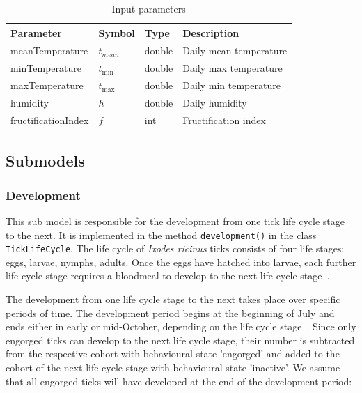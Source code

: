 \documentclass[a4paper, 11pt]{scrartcl}
\newcommand{\inlinecode}[1]{\texttt{\small #1}}
\begin{document}
\begin{table}[h!]
\caption{Input parameters}
\label{tab:input_parameters}
\begin{tabularx}{\textwidth}{llll}
\toprule
\textbf{Parameter} & \textbf{Symbol} & \textbf{Type}     & \textbf{Description}       \\
\midrule
meanTemperature    & $t_{mean}$      & double            & Daily mean temperature     \\
minTemperature     & $t_{\min}$      & double            & Daily max temperature      \\
maxTemperature     & $t_{\max}$      & double            & Daily min temperature      \\
humidity           & $h$             & double            & Daily humidity             \\
\midrule
fructificationIndex & $f$            & int               & Fructification index       \\
\bottomrule
\end{tabularx}
\end{table}


\newpage
\subsection{Submodels}\label{submodels}

\subsubsection{Development}
This sub model is responsible for the development from one tick life cycle stage to the next. It is implemented in the method \inlinecode{development()} in the class \inlinecode{TickLifeCycle}. The life cycle of \textit{Ixodes ricinus} ticks consists of four life stages: eggs, larvae, nymphs, adults. Once the eggs have hatched into larvae, each further life cycle stage requires a bloodmeal to develop to the next life cycle stage~\parencite{tba}.

The development from one life cycle stage to the next takes place over specific periods of time. The development period begins at the beginning of July and ends either in early or mid-October, depending on the life cycle stage~\parencite{tba}. Since only engorged ticks can develop to the next life cycle stage, their number is subtracted from the respective cohort with behavioural state 'engorged' and added to the cohort of the next life cycle stage with behavioural state 'inactive'. We assume that all engorged ticks will have developed at the end of the development period:
\end{document}
